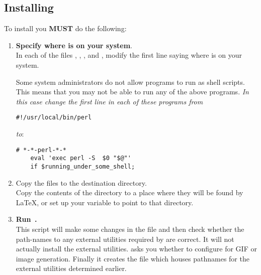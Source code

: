 \htmlrule
\tableofchildlinks

\subsection{Installing \protect\latextohtml}%
\html{\\}%
To install \latextohtml{} you \textbf{MUST} do the following:
%
\begin{enumerate}
\item 
\textbf{Specify where \Perl{} is on your system}. \\
In each of the files , , ,
 and ,
modify the first line saying where \Perl{} is on your system.


\noindent
Some system administrators do not allow \Perl{} programs to run as shell scripts. 
This means that you may not be able to run any of the above programs. 
\emph{In this case change the first line in each of these programs from }
\html{\smallskip}
\begin{small}
\verb|#!/usr/local/bin/perl | 
\end{small}
\html{\smallskip}\emph{to}:
\begin{small}
\begin{verbatim}
# *-*-perl-*-*
    eval 'exec perl -S  $0 "$@"'
    if $running_under_some_shell; 
\end{verbatim}
\end{small}

%
%
\item
Copy the files to the destination directory.\\
Copy the contents of the  directory to a place where they
will be found by \LaTeX, or set up your  variable to point
to that directory.

%
%
\item 
\textbf{Run \,.} \\
This \Perl{} script will make some changes in the  file
and then check whether the path-names to any external utilities
required by  are correct.
It will not actually install the external utilities. 
 asks you whether to configure for GIF or
 image generation.
Finally it creates the file  which houses pathnames for the
external utilities determined earlier.


\end{enumerate}
